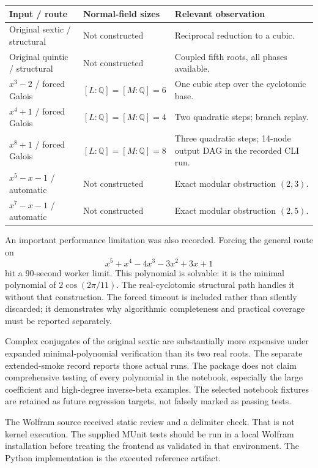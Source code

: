 \documentclass[11pt,letterpaper]{article}
\theoremstyle{definition}\newtheorem{definition}[theorem]{Definition}
\theoremstyle{remark}\newtheorem{remark}[theorem]{Remark}
\newcommand{\Q}{\mathbb Q}\newcommand{\C}{\mathbb C}\newcommand{\Z}{\mathbb Z}
\begin{document}
\begin{center}
\begin{tabular}{@{}p{}p{}p{}@{}}
\toprule
Input / route & Normal-field sizes & Relevant observation \\\midrule
Original sextic / structural & Not constructed & Reciprocal reduction to a cubic.\\
Original quintic / structural & Not constructed & Coupled fifth roots, all phases available.\\
\(x^3-2\) / forced Galois & \([L:\Q]=[M:\Q]=6\) & One cubic step over the cyclotomic base.\\
\(x^4+1\) / forced Galois & \([L:\Q]=[M:\Q]=4\) & Two quadratic steps; branch replay.\\
\(x^8+1\) / forced Galois & \([L:\Q]=[M:\Q]=8\) & Three quadratic steps; 14-node output DAG in the recorded CLI run.\\
\(x^5-x-1\) / automatic & Not constructed & Exact modular obstruction \((2,3)\).\\
\(x^7-x-1\) / automatic & Not constructed & Exact modular obstruction \((2,5)\).\\
\bottomrule
\end{tabular}
\end{center}

An important performance limitation was also recorded. Forcing the general
route on
\[
 x^5+x^4-4x^3-3x^2+3x+1
\]
hit a 90-second worker limit. This polynomial is solvable: it is the minimal
polynomial of \(2\cos(2\pi/11)\). The real-cyclotomic structural path handles
it without that construction. The forced timeout is included rather than
silently discarded; it demonstrates why algorithmic completeness and practical
coverage must be reported separately.

Complex conjugates of the original sextic are substantially more expensive
under expanded minimal-polynomial verification than its two real roots.
The separate extended-smoke record reports those actual runs. The package
does not claim comprehensive testing of every polynomial in the notebook,
especially the large coefficient and high-degree inverse-beta examples.
The selected notebook fixtures are retained as future regression targets,
not falsely marked as passing tests.

The Wolfram source received static review and a delimiter check. That is not
kernel execution. The supplied MUnit tests should be run in a local Wolfram
installation before treating the frontend as validated in that environment.
The Python implementation is the executed reference artifact.
\end{document}
